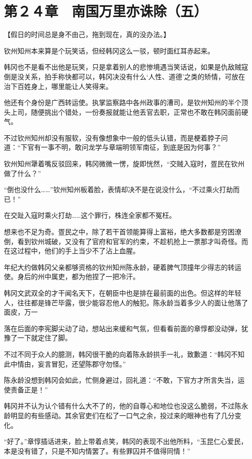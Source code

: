 \section{第２４章　南国万里亦诛除（五）}

【假日的时间总是身不由己，拖到现在，真的没办法。】

钦州知州本来算是个玩笑话，但经韩冈这么一驳，顿时面红耳赤起来。

韩冈也不是看不出他是玩笑，只是拿着别人的悲惨境遇当笑话说，如果是仇敌贼寇倒是没关系，拍手称快都可以，韩冈决没有什么‘人性、道德’之类的矫情，可放在治下百姓身上，哪里能让人笑得来。

他还有个身份是广西转运使。执掌监察路中各州政事的漕司，是钦州知州的半个顶头上司，随便挑出个错处，一份奏报就能让他丢官去职，正常也不敢在韩冈面前硬气。

不过钦州知州却没有服软，没有像想象中一般的低头认错，而是梗着脖子问道：“下官有一事不明，敢问龙学与章端明领军南征，到底是因为何事？”

钦州知州犟着嘴反驳回来，韩冈微微一愣，旋即恍然，“交贼入寇时，疍民在钦州做了什么？”

“倒也没什么……”钦州知州板着脸，表情却决不是在说没什么，“不过乘火打劫而已！”

在交趾入寇时乘火打劫……这个罪行，株连全家都不冤枉。

想来也不足为奇。疍民之中，除了若干首领能算得上富裕，绝大多数都是穷困潦倒，看到钦州城破，又没有了官府和官军的约束，不趁机抢上一票那才叫奇怪。而在这过程中，他们的手上当少不了沾上血腥。

年纪大约做韩冈父亲都够资格的钦州知州陈永龄，硬着脾气顶撞年少得志的转运使。身后的州中属吏，都为他捏了一把冷汗。

韩冈文武双全的才干闻名天下，在朝臣中也是排在最前面的出色。但这样的年轻人，往往都是锋芒毕露，很少能容忍他人的触犯。陈永龄当着多少人的面让他落了面皮，万一

落在后面的李宪脚尖动了动，想站出来缓和气氛，但看看前面的章惇都没动弹，犹豫了一下就定住了脚。

不过不同于众人的臆测，韩冈很干脆的向着陈永龄拱手一礼，致歉道：“韩冈不知此中情由，妄言冒犯，还望陈郡守勿怪。”

陈永龄没想到韩冈会如此，忙侧身避过，回礼道：“不敢，下官方才所言失当，运使责备正是！”

韩冈并不认为认个错有什么大不了的，他的自尊心和地位也没这么脆弱，不过陈永龄明显的有些感动。其余官吏们在松了一口气之余，投过来的眼神也有了几分变化。

“好了。”章惇插话进来，脸上带着点笑，韩冈的表现不出他所料，“玉昆仁心爱民，本是没有错了，只是不知内情罢了。有些罪囚并不值得同情！”


